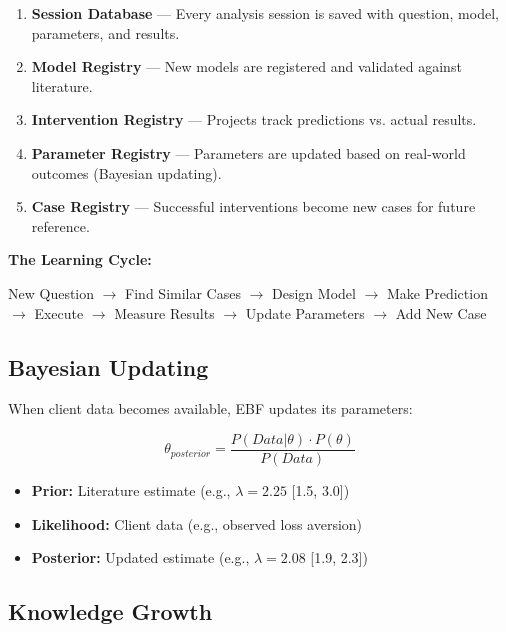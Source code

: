 \begin{enumerate}
\item \textbf{Session Database} --- Every analysis session is saved with
      question, model, parameters, and results.
\item \textbf{Model Registry} --- New models are registered and validated
      against literature.
\item \textbf{Intervention Registry} --- Projects track predictions vs.
      actual results.
\item \textbf{Parameter Registry} --- Parameters are updated based on
      real-world outcomes (Bayesian updating).
\item \textbf{Case Registry} --- Successful interventions become new cases
      for future reference.
\end{enumerate}

\begin{tcolorbox}[colback=gray!5!white, colframe=gray!75!black]
\begin{center}
\textbf{The Learning Cycle:}

New Question $\rightarrow$ Find Similar Cases $\rightarrow$ Design Model
$\rightarrow$ Make Prediction $\rightarrow$ Execute $\rightarrow$
Measure Results $\rightarrow$ Update Parameters $\rightarrow$ Add New Case
\end{center}
\end{tcolorbox}

\subsection{Bayesian Updating}

When client data becomes available, EBF updates its parameters:

\begin{equation}
\theta_{posterior} = \frac{P(Data | \theta) \cdot P(\theta)}{P(Data)}
\end{equation}

\begin{itemize}[nosep]
\item \textbf{Prior:} Literature estimate (e.g., $\lambda = 2.25$ [1.5, 3.0])
\item \textbf{Likelihood:} Client data (e.g., observed loss aversion)
\item \textbf{Posterior:} Updated estimate (e.g., $\lambda = 2.08$ [1.9, 2.3])
\end{itemize}

\subsection{Knowledge Growth}

